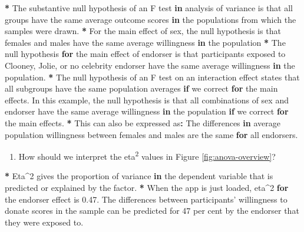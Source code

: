 \documentclass[a4paper]{book}
\newenvironment{Shaded}{\begin{snugshade}}{\end{snugshade}}
\newcommand{\DecValTok}[1]{\textcolor[rgb]{0.00,0.00,0.00}{#1}}
\newcommand{\FloatTok}[1]{\textcolor[rgb]{0.00,0.00,0.00}{#1}}
\newcommand{\StringTok}[1]{\textcolor[rgb]{0.00,0.00,0.00}{#1}}
\newcommand{\ControlFlowTok}[1]{\textcolor[rgb]{0.00,0.00,0.00}{\textbf{#1}}}
\newcommand{\OperatorTok}[1]{\textcolor[rgb]{0.00,0.00,0.00}{\textbf{#1}}}
\newcommand{\NormalTok}[1]{#1}
\providecommand{\tightlist}{%
  \setlength{\itemsep}{0pt}\setlength{\parskip}{0pt}}
\theoremstyle{definition}
\theoremstyle{definition}
\theoremstyle{definition}
\theoremstyle{remark}
\begin{document}
\begin{Shaded}
\begin{Highlighting}[]
\OperatorTok{*}\StringTok{ }\NormalTok{The substantive null hypothesis of an F test }\ControlFlowTok{in}\NormalTok{ analysis of variance is that}
\NormalTok{all groups have the same average outcome scores }\ControlFlowTok{in}\NormalTok{ the populations from which}
\NormalTok{the samples were drawn.}
\OperatorTok{*}\StringTok{ }\NormalTok{For the main effect of sex, the null hypothesis is that females and males}
\NormalTok{have the same average willingness }\ControlFlowTok{in}\NormalTok{ the population}
\OperatorTok{*}\StringTok{ }\NormalTok{The null hypothesis }\ControlFlowTok{for}\NormalTok{ the main effect of endorser is that participants exposed}
\NormalTok{to Clooney, Jolie, or no celebrity endorser have the same average willingness}
\ControlFlowTok{in}\NormalTok{ the population.}
\OperatorTok{*}\StringTok{ }\NormalTok{The null hypothesis of an F test on an interaction effect states that all}
\NormalTok{subgroups have the same population averages }\ControlFlowTok{if}\NormalTok{ we correct }\ControlFlowTok{for}\NormalTok{ the main}
\NormalTok{effects. In this example, the null hypothesis is that all combinations of sex}
\NormalTok{and endorser have the same average willingness }\ControlFlowTok{in}\NormalTok{ the population }\ControlFlowTok{if}\NormalTok{ we correct}
\ControlFlowTok{for}\NormalTok{ the main effects.}
\OperatorTok{*}\StringTok{ }\NormalTok{This can also be expressed as}\OperatorTok{:}\StringTok{ }\NormalTok{The differences }\ControlFlowTok{in}\NormalTok{ average population}
\NormalTok{willingness between females and males are the same }\ControlFlowTok{for}\NormalTok{ all endorsers.}
\end{Highlighting}
\end{Shaded}

\begin{enumerate}
\def\labelenumi{\arabic{enumi}.}
\setcounter{enumi}{3}
\tightlist
\item
  How should we interpret the eta\textsuperscript{2} values in Figure
  \ref{fig:anova-overview}?
\end{enumerate}

\begin{Shaded}
\begin{Highlighting}[]
\OperatorTok{*}\StringTok{ }\NormalTok{Eta}\OperatorTok{^}\DecValTok{2}\NormalTok{ gives the proportion of variance }\ControlFlowTok{in}\NormalTok{ the dependent variable that is}
\NormalTok{predicted or explained by the factor.}
\OperatorTok{*}\StringTok{ }\NormalTok{When the app is just loaded, eta}\OperatorTok{^}\DecValTok{2} \ControlFlowTok{for}\NormalTok{ the endorser effect is }\FloatTok{0.47}\NormalTok{. The}
\NormalTok{differences between participants}\StringTok{' willingness to donate scores in the sample can}
\StringTok{be predicted for 47 per cent by the endorser that they were exposed to.}
\end{Highlighting}
\end{Shaded}
\end{document}
